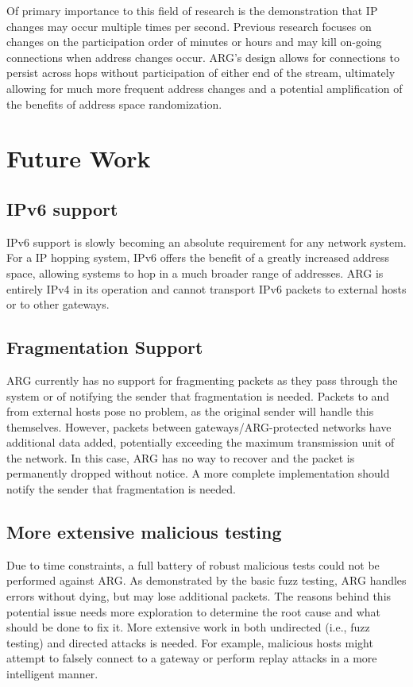 \par Of primary importance to this field of research is the demonstration that \ac{IP} changes may occur multiple times per second. Previous research focuses on changes on the participation order of minutes or hours and may kill on-going connections when address changes occur. \ac{ARG}'s design allows for connections to persist across hops without participation of either end of the stream, ultimately allowing for much more frequent address changes and a potential amplification of the benefits of address space randomization.

\section{Future Work}
\label{sec:future_work}
\subsection{IPv6 support}
\par \ac{IPv6} support is slowly becoming an absolute requirement for any network system. For a \ac{IP} hopping system, \ac{IPv6} offers the benefit of a greatly increased address space, allowing systems to hop in a much broader range of addresses. \ac{ARG} is entirely \ac{IPv4} in its operation and cannot transport \ac{IPv6} packets to external hosts or to other gateways.

\subsection{Fragmentation Support}
\par \ac{ARG} currently has no support for fragmenting packets as they pass through the system or of notifying the sender that fragmentation is needed. Packets to and from external hosts pose no problem, as the original sender will handle this themselves. However, packets between gateways/\ac{ARG}-protected networks have additional data added, potentially exceeding the maximum transmission unit of the network. In this case, \ac{ARG} has no way to recover and the packet is permanently dropped without notice. A more complete implementation should notify the sender that fragmentation is needed.

\subsection{More extensive malicious testing}
\par Due to time constraints, a full battery of robust malicious tests could not be performed against \ac{ARG}. As demonstrated by the basic fuzz testing, \ac{ARG} handles errors without dying, but may lose additional packets. The reasons behind this potential issue needs more exploration to determine the root cause and what should be done to fix it. More extensive work in both undirected (i.e., fuzz testing) and directed attacks is needed. For example, malicious hosts might attempt to falsely connect to a gateway or perform replay attacks in a more intelligent manner.  

